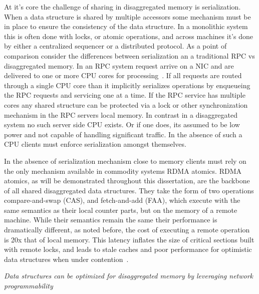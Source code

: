 \documentclass[12pt]{ucsddissertation}
\begin{document}
\begin{dissertationintroduction}
At it's core the challenge of sharing in disaggregated memory is serialization. When a data
structure is shared by multiple accessors some mechanism must be in place to ensure the consistency
of the data structure. In a monolithic system this is often done with locks, or atomic operations,
and across machines it's done by either a centralized sequencer or a distributed protocol. As a
point of comparison consider the differences between serialization an a traditional RPC vs
disaggregated memory. In an RPC system request arrive on a NIC and are delivered to one or more CPU
cores for processing~\cite{cuckoo-improvements,pilaf,herd,memc3,memcached}. If all requests are
routed through a single CPU core than it implicitly serializes operations by enqueueing the RPC
requests and servicing one at a time. If the RPC service has multiple cores any shared structure can
be protected via a lock or other synchronization mechanism in the RPC servers local memory. In
contrast in a disaggregated system no such server side CPU exists. Or if one does, its assumed to be
low power and not capable of handling significant traffic. In the absence of such a CPU clients must
enforce serialization amongst themselves.

In the absence of serialization mechanism close to memory clients must rely on the only mechanism
available in commodity systems RDMA atomics. RDMA atomics, as will be demonstrated throughout this
dissertation, are the backbone of all shared disaggregated data structures. They take the form of
two operations compare-and-swap (CAS), and fetch-and-add (FAA), which execute with the same
semantics as their local counter parts, but on the memory of a remote machine. While their semantics
remain the same their performance is dramatically different, as noted before, the cost of executing
a remote operation is 20x that of local memory. This latency inflates the size of critical sections
built with remote locks, and leads to stale caches and poor performance for optimistic data
structures when under contention~\cite{clover,sherman,fusee,race,rolex}. \\


\begin{center}
\textit{Data structures can be optimized for disaggregated memory by leveraging network programmability} \\
\end{center}





\end{dissertationintroduction}
\end{document}

